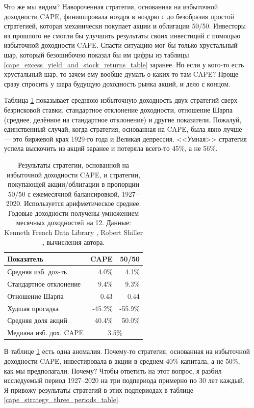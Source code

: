 Что же мы видим? Навороченная стратегия, основанная на избыточной доходности CAPE, финишировала ноздря в ноздрю с до безобразия простой стратегией, которая механически покупает акции и облигации 50/50. Инвесторы из прошлого не смогли бы улучшить результаты своих инвестиций с помощью избыточной доходности CAPE. Спасти ситуацию мог бы только хрустальный шар, который безошибочно показал бы им цифры из таблицы \ref{cape_excess_yield_and_stock_returns_table} заранее. Но если у кого-то есть хрустальный шар, то зачем ему вообще думать о каких-то там CAPE? Проще сразу спросить у шара будущую доходность рынка акций, и дело с концом.

Таблица \ref{cape_strategy_1927_table} показывает среднюю избыточную доходность двух стратегий сверх безрисковой ставки, стандартное отклонение доходности, отношение Шарпа (среднее, делённое на стандартное отклонение) и другие показатели. Пожалуй, единственный случай, когда стратегия, основанная на CAPE, была явно лучше --- это биржевой крах 1929-го года и Великая депрессия. <<Умная>> стратегия успела выскочить из акций заранее и потеряла всего-то 45\%, а не 56\%.

\begin{table}[h!]
\centering
\begin{tabular}{l|r|r}
Показатель         & CAPE  & 50/50 \\ \hline
Средняя изб. дох-ть & 4.0\% & 4.1\% \\
Стандартное отклонение  & 9.4\% & 9.3\% \\
Отношение Шарпа    &  0.43 & 0.44  \\
Худшая просадка    & -45.2\% & -55.9\% \\
Средняя доля акций & 40.4\%  & 50.0\% \\
\cline{2-3}
Медиана изб. дох. CAPE & \multicolumn{2}{c}{3.5\%}
\end{tabular}
\caption{Результаты стратегии, основанной на избыточной доходности CAPE, и стратегии, покупающей акции/облигации в пропорции 50/50 с ежемесячной балансировкой, 1927--2020. Используется арифметическое среднее. Годовые доходности получены умножением месячных доходностей на 12. Данные: Kenneth French Data Library \cite{kennethFrench}, Robert Shiller \cite{shillerOnline}, вычисления автора.}
\label{cape_strategy_1927_table}
\end{table}

В таблице \ref{cape_strategy_1927_table} есть одна аномалия. Почему-то стратегия, основанная на избыточной доходности CAPE, инвестировала в акции в среднем 40\% капитала, а не 50\%, как мы предполагали. Почему? Чтобы ответить на этот вопрос, я разбил исследуемый период 1927--2020 на три подпериода примерно по 30 лет каждый. Я привожу результаты стратегий в этих подпериодах в таблице \ref{cape_strategy_three_periods_table}.

